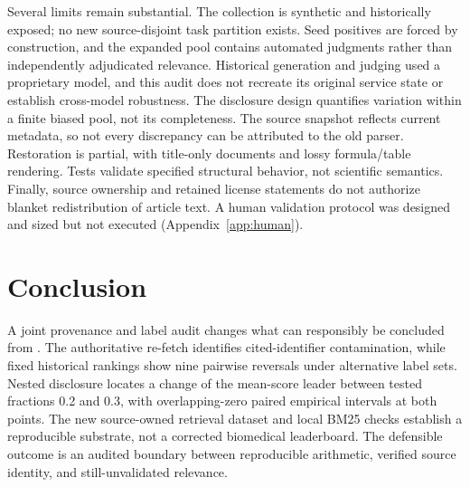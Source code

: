 Several limits remain substantial. The collection is synthetic and historically exposed; no new source-disjoint task partition exists. Seed positives are forced by construction, and the expanded pool contains automated judgments rather than independently adjudicated relevance. Historical generation and judging used a proprietary model, and this audit does not recreate its original service state or establish cross-model robustness. The disclosure design quantifies variation within a finite biased pool, not its completeness. The source snapshot reflects current metadata, so not every discrepancy can be attributed to the old parser. Restoration is partial, with title-only documents and lossy formula/table rendering. Tests validate specified structural behavior, not scientific semantics. Finally, source ownership and retained license statements do not authorize blanket redistribution of article text. A human validation protocol was designed and sized but not executed (Appendix~\ref{app:human}).

\section{Conclusion}
A joint provenance and label audit changes what can responsibly be concluded from \cer. The authoritative re-fetch identifies cited-identifier contamination, while fixed historical rankings show nine pairwise reversals under alternative label sets. Nested disclosure locates a change of the mean-score leader between tested fractions 0.2 and 0.3, with overlapping-zero paired empirical intervals at both points. The new source-owned retrieval dataset and local BM25 checks establish a reproducible substrate, not a corrected biomedical leaderboard. The defensible outcome is an audited boundary between reproducible arithmetic, verified source identity, and still-unvalidated relevance.
\label{page:mainend}


